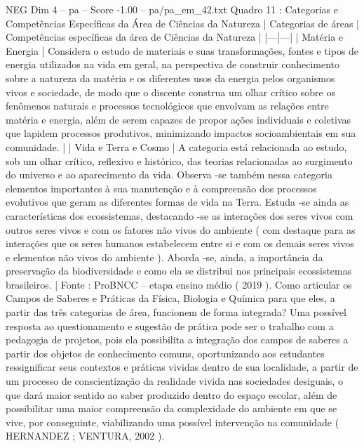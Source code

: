 \begin{textsample}{NEG Dim 4 – pa – Score -1.00 – pa/pa\_em\_42.txt}  \label{ex:f4_neg_278}
Quadro 11 : Categorias e Competências Específicas da Área de Ciências da Natureza | Categorias de áreas | Competências específicas da área de Ciências da Natureza | |---|---| | Matéria e Energia | Considera o estudo de materiais e suas transformações, fontes e tipos de energia utilizados na vida em geral, na perspectiva de construir conhecimento sobre a natureza da matéria e os diferentes usos da energia pelos organismos vivos e sociedade, de modo que o discente construa um olhar crítico sobre os fenômenos naturais e processos tecnológicos que envolvam as relações entre matéria e energia, além de serem capazes de propor ações individuais e coletivas que lapidem processos produtivos, minimizando impactos socioambientais em sua comunidade. | | Vida e Terra e Cosmo | A categoria está relacionada ao estudo, sob um olhar crítico, reflexivo e histórico, das teorias relacionadas ao surgimento do universo e ao aparecimento da vida.
Observa -se também nessa categoria elementos importantes à sua manutenção e à compreensão dos processos evolutivos que geram as diferentes formas de vida na Terra.
Estuda -se ainda as características dos ecossistemas, destacando -se as interações dos seres vivos com outros seres vivos e com os fatores não vivos do ambiente ( com destaque para as interações que os seres humanos estabelecem entre si e com os demais seres vivos e elementos não vivos do ambiente ).
Aborda -se, ainda, a importância da preservação da biodiversidade e como ela se distribui nos principais ecossistemas brasileiros. | Fonte : ProBNCC – etapa ensino médio ( 2019 ).
Como articular os Campos de Saberes e Práticas da Física, Biologia e Química para que eles, a partir das três categorias de área, funcionem de forma integrada?
Uma possível resposta ao questionamento e sugestão de prática pode ser o trabalho com a pedagogia de projetos, pois ela possibilita a integração dos campos de saberes a partir dos objetos de conhecimento comuns, oportunizando aos estudantes ressignificar seus contextos e práticas vividas dentro de sua localidade, a partir de um processo de conscientização da realidade vivida nas sociedades desiguais, o que dará maior sentido ao saber produzido dentro do espaço escolar, além de possibilitar uma maior compreensão da complexidade do ambiente em que se vive, por conseguinte, viabilizando uma possível intervenção na comunidade ( HERNANDEZ ; VENTURA, 2002 ).

\end{textsample}
